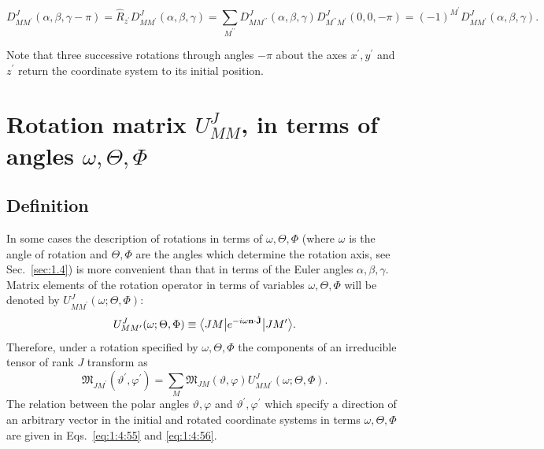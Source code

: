 \begin{enumerate}[label=(\roman*)]
\begin{equation}
D_{M M^{\prime}}^{J}(\alpha, \beta, \gamma-\pi)=\hat{R}_{z^{\prime}} D_{M M^{\prime}}^{J}(\alpha, \beta, \gamma)=\sum_{M^{\prime \prime}} D_{M M^{\prime \prime}}^{J}(\alpha, \beta, \gamma) D_{M^{\prime \prime} M^{\prime}}^{J}(0,0,-\pi)=(-1)^{M^{\prime}} D_{M M^{\prime}}^{J}(\alpha, \beta, \gamma). \label{eq:4:4:8}
\end{equation}
\end{enumerate}
Note that three successive rotations through angles $-\pi$ about the axes $x^{\prime}, y^{\prime}$ and $z^{\prime}$ return the coordinate system to its initial position.

\section{Rotation matrix $U_{M M}^{J}$, in terms of angles $\omega, \Theta, \Phi$}\label{sec:4.5}
\subsection{Definition}\label{sec:4.5.1}
In some cases the description of rotations in terms of $\omega, \Theta, \Phi$ (where $\omega$ is the angle of rotation and $\Theta, \Phi$ are the angles which determine the rotation axis, see Sec.~\ref{sec:1.4}) is more convenient than that in terms of the Euler angles $\alpha, \beta, \gamma$. Matrix elements of the rotation operator in terms of variables $\omega, \Theta, \Phi$ will be denoted by $U_{M M^{\prime}}^{J}(\omega ; \Theta, \Phi):$
\begin{equation}
U_{M M^{\prime}}^{J}(\omega ; \Theta, \Phi) \equiv\bigl\langle J M \big| e^{-i \omega \mathbf{n} \cdot \hat{\mathbf{J}}} \big| J M^{\prime} \bigr\rangle. \label{eq:4:5:1}
\end{equation}
Therefore, under a rotation specified by $\omega, \Theta, \Phi$ the components of an irreducible tensor of rank $J$ transform as
\begin{equation}
\mathfrak{M}_{J M^{\prime}}\left(\vartheta^{\prime}, \varphi^{\prime}\right)=\sum_{M} \mathfrak{M}_{J M}(\vartheta, \varphi) U_{M M^{\prime}}^{J}(\omega ; \Theta, \Phi) .\label{eq:4:5:2}
\end{equation}
The relation between the polar angles $\vartheta, \varphi$ and $\vartheta^{\prime}, \varphi^{\prime}$ which specify a direction of an arbitrary vector in the initial and rotated coordinate systems in terms $\omega, \Theta, \Phi$ are given in Eqs.~\eqref{eq:1:4:55} and \eqref{eq:1:4:56}.

